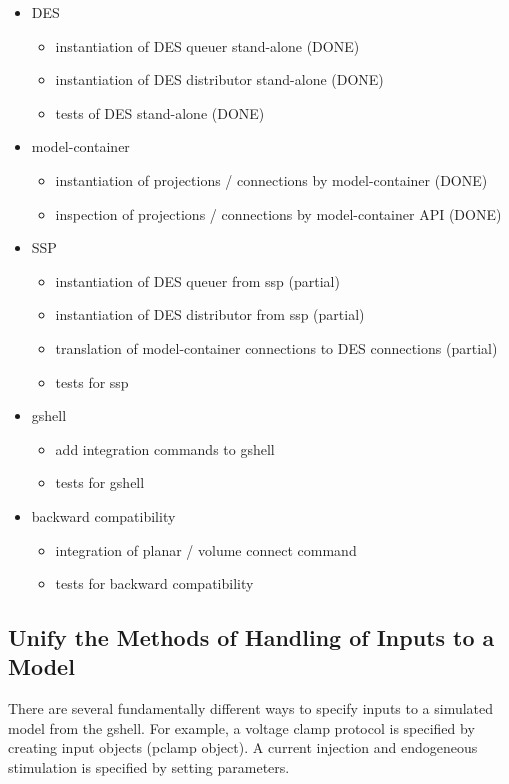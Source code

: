 \documentclass[12pt]{article}
\begin{document}
\begin{itemize}
\item DES
  \begin{itemize}
  \item instantiation of DES queuer stand-alone (DONE)
  \item instantiation of DES distributor stand-alone (DONE)
  \item tests of DES stand-alone (DONE)
  \end{itemize}
\item model-container
  \begin{itemize}
  \item instantiation of projections / connections by model-container (DONE)
  \item inspection of projections / connections by model-container API (DONE)
  \end{itemize}
\item SSP
  \begin{itemize}
  \item instantiation of DES queuer from ssp (partial)
  \item instantiation of DES distributor from ssp (partial)
  \item translation of model-container connections to DES connections (partial)
  \item tests for ssp
  \end{itemize}
\item gshell
  \begin{itemize}
  \item add integration commands to gshell
  \item tests for gshell
  \end{itemize}
\item backward compatibility
  \begin{itemize}
  \item integration of planar / volume connect command
  \item tests for backward compatibility
  \end{itemize}
\end{itemize}


\subsection{Unify the Methods of Handling of Inputs to a Model}

There are several fundamentally different ways to specify inputs to a
simulated model from the gshell.  For example, a voltage clamp
protocol is specified by creating input objects (pclamp object).  A
current injection and endogeneous stimulation is specified by setting
parameters.
\end{document}
